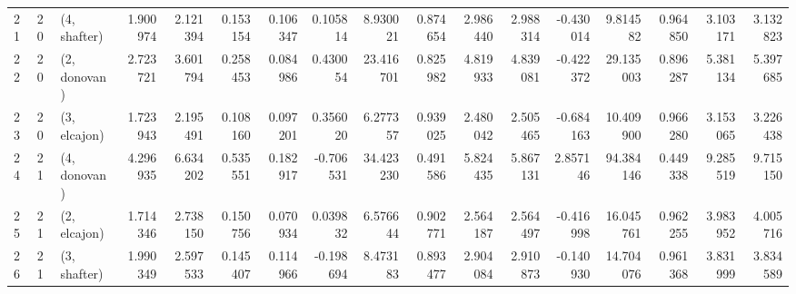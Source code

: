 \begin{tabular}{lllrrrrrrrrrrrrrr}
21 &    20 &  (4, shafter) &  1.900974 &  2.121394 &   0.153154 &  0.106347 &  0.105814 &    8.930021 &  0.874654 &   2.986440 &   2.988314 & -0.430014 &    9.814582 &  0.964850 &   3.103171 &   3.132823 \\
22 &    20 &  (2, donovan) &  2.723721 &  3.601794 &   0.258453 &  0.084986 &  0.430054 &   23.416701 &  0.825982 &   4.819933 &   4.839081 & -0.422372 &   29.135003 &  0.896287 &   5.381134 &   5.397685 \\
23 &    20 &  (3, elcajon) &  1.723943 &  2.195491 &   0.108160 &  0.097201 &  0.356020 &    6.277357 &  0.939025 &   2.480042 &   2.505465 & -0.684163 &   10.409900 &  0.966280 &   3.153065 &   3.226438 \\
24 &    21 &  (4, donovan) &  4.296935 &  6.634202 &   0.535551 &  0.182917 & -0.706531 &   34.423230 &  0.491586 &   5.824435 &   5.867131 &  2.857146 &   94.384146 &  0.449338 &   9.285519 &   9.715150 \\
25 &    21 &  (2, elcajon) &  1.714346 &  2.738150 &   0.150756 &  0.070934 &  0.039832 &    6.576644 &  0.902771 &   2.564187 &   2.564497 & -0.416998 &   16.045761 &  0.962255 &   3.983952 &   4.005716 \\
26 &    21 &  (3, shafter) &  1.990349 &  2.597533 &   0.145407 &  0.114966 & -0.198694 &    8.473183 &  0.893477 &   2.904084 &   2.910873 & -0.140930 &   14.704076 &  0.961368 &   3.831999 &   3.834589 \\
\bottomrule
\end{tabular}
